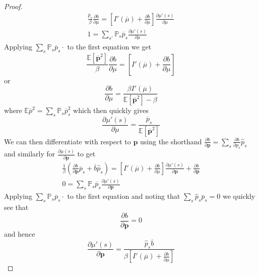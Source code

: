 \documentclass[12pt]{article}
\newcommand{\EE}{\mathbb E}
\newcommand{\pbar}{{\overline p}}
\newcommand{\bbar}{{\overline b}}
\newcommand{\mubar}{{\overline \mu}}
\begin{document}
\begin{appendix}
\begin{proof}
\begin{align*}
	\frac{\pbar_s}{\beta}\frac{\partial b}{\partial \mu} = \left[I'(\mubar)+\frac{\partial b}{\partial \mu}\right]\frac{\partial \mu'(s)}{\partial \mu}\\
	1 = \sum_{s'} \mathbb P_s \overline p_s \frac{\partial \mu'(s)}{\partial \mu}
\end{align*}  Applying $\sum_s\mathbb P_s \pbar_s\cdot$ to the first equation we get
\[
	\frac{\EE[\bm \pbar^2]}{\beta}\frac{\partial b}{\partial \mu} = \left[I'(\mubar)+\frac{\partial b}{\partial \mu}\right]
\]or 
\begin{equation}
	\frac{\partial b}{\partial \mu} = \frac{\beta I'(\mubar)}{\EE[\bm\pbar^2]-\beta}
\end{equation}where $\EE\pbar^2 = \sum_s\mathbb P_s\pbar_s^2$ which then quickly gives
\begin{equation}
	\frac{\partial \mu'(s)}{\partial \mu}  = \frac{\pbar_s}{\EE[\bm \pbar^2]}
\end{equation}  We can then differentiate with respect to $\bm p$ using the shorthand $\frac{\partial b}{\partial \bm p} = \sum_s \frac{\partial b}{\partial p_s}\hat p_s$ and similarly for $\frac{\partial \mu(s)}{\partial \bm p}$ to get
\begin{align*}
	\frac1\beta\left(\frac{\partial b}{\partial\bm p}\pbar_s + \bbar\hat p_s\right) = \left[I'(\mubar) + \frac{\partial b}{\partial\mu}\right]\frac{\partial \mu'(s)}{\partial \bm p} + \frac{\partial b}{\partial\bm p}\\
	0 = \sum_s\mathbb P_s\pbar_s \frac{\partial\mu'(s)}{\partial \bm p}
\end{align*} Applying $\sum_s \mathbb P_s\pbar_s\cdot$ to the first equation and noting that $\sum_s \hat p_s \pbar_s = 0$ we quickly see that 
\begin{equation}
	\frac{\partial b}{\partial\bm p} = 0
\end{equation}and hence
\begin{equation}
	\frac{\partial \mu'(s)}{\partial\bm p} = \frac{\hat p_s\bbar}{\beta\left[I'(\mubar)+\frac{\partial b}{\partial\mu}\right]}
\end{equation}


\end{proof}
\end{appendix}
\end{document}
